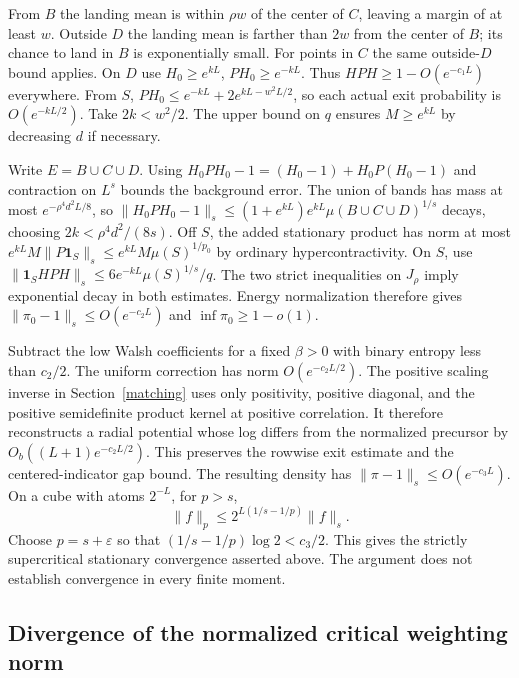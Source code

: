\documentclass[11pt]{article}
\newcommand{\one}{\mathbf 1}
\begin{document}
From \(B\) the landing mean is within \(\rho w\) of the center of \(C\), leaving a margin of at least \(w\). Outside \(D\) the landing mean is farther than \(2w\) from the center of \(B\); its chance to land in \(B\) is exponentially small. For points in \(C\) the same outside-\(D\) bound applies. On \(D\) use \(H_0\ge e^{kL}\), \(PH_0\ge e^{-kL}\). Thus \(H PH\ge1-O(e^{-c_1L})\) everywhere. From \(S\), \(PH_0\le e^{-kL}+2e^{kL-w^2L/2}\), so each actual exit probability is \(O(e^{-kL/2})\). Take \(2k<w^2/2\). The upper bound on \(q\) ensures \(M\ge e^{kL}\) by decreasing \(d\) if necessary.

Write \(E=B\cup C\cup D\). Using \(H_0 PH_0-1=(H_0-1)+H_0 P(H_0-1)\) and contraction on \(L^s\) bounds the background error. The union of bands has mass at most \(e^{-\rho^4 d^2L/8}\), so \(\|H_0PH_0-1\|_s\le(1+e^{kL})e^{kL}\mu(B\cup C\cup D)^{1/s}\) decays, choosing \(2k<\rho^4d^2/(8s)\). Off \(S\), the added stationary product has norm at most \(e^{kL}M\|P\one_S\|_s\le e^{kL}M\mu(S)^{1/p_0}\) by ordinary hypercontractivity. On \(S\), use \(\|\one_S HPH\|_s\le6e^{-kL}\mu(S)^{1/s}/q\). The two strict inequalities on \(J_\rho\) imply exponential decay in both estimates. Energy normalization therefore gives \(\|\pi_0-1\|_s\le O(e^{-c_2L})\) and \(\inf\pi_0\ge1-o(1)\).

Subtract the low Walsh coefficients for a fixed \(\beta>0\) with binary entropy less than \(c_2/2\). The uniform correction has norm \(O(e^{-c_2 L/2})\). The positive scaling inverse in Section~\ref{matching} uses only positivity, positive diagonal, and the positive semidefinite product kernel at positive correlation. It therefore reconstructs a radial potential whose log differs from the normalized precursor by \(O_b((L+1)e^{-c_2L/2})\). This preserves the rowwise exit estimate and the centered-indicator gap bound. The resulting density has \(\|\pi-1\|_s\le O(e^{-c_3 L})\). On a cube with atoms \(2^{-L}\), for \(p>s\),
\[
 \|f\|_p\le 2^{L(1/s-1/p)}\|f\|_s .
\]
Choose \(p=s+\varepsilon\) so that \((1/s-1/p)\log2<c_3/2\). This gives the strictly supercritical stationary convergence asserted above. The argument does not establish convergence in every finite moment.

\subsection{Divergence of the normalized critical weighting norm}
\end{document}
